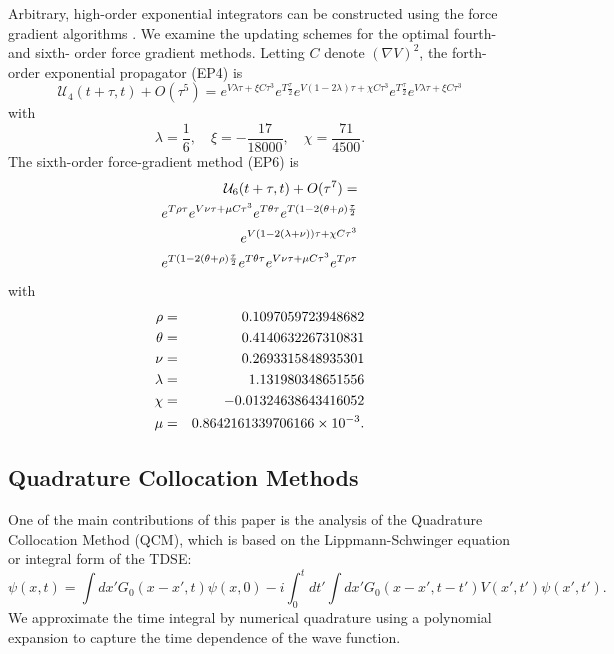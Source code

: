 \documentclass[review,letterpaper]{elsarticle}
\begin{document}
Arbitrary, high-order exponential integrators can be constructed using the
force gradient algorithms \cite{force-gradient}. We examine the updating schemes for the optimal fourth- and sixth- order force gradient methods.
\newcommand{\VTV}{C}
Letting $C$ denote $(\nabla V)^2$, the forth-order exponential propagator (EP4) is
\begin{equation}
\mathcal{U}_{4}(t+\tau,t) +O(\tau^5)=
e^{V \lambda \tau+\xi \VTV \tau^3}
e^{T \frac\tau 2}
e^{V(1-2\lambda)\tau+\chi \VTV \tau^3}
e^{T \frac\tau 2}
e^{V \lambda \tau+\xi \VTV \tau^3}
\end{equation}
with
\begin{equation}
\lambda=\frac16, \quad \xi=-\frac{17}{18000}, \quad \chi=\frac{71}{4500} .
\end{equation}
The sixth-order force-gradient method (EP6) is
\begin{eqnarray}
\mathcal{U}_{6}(t+\tau,t) +O(\tau^7)= \notag\\
e^{T \rho \tau} e^{V \nu \tau +\mu\VTV\tau^3} e^{T \theta \tau} e^{T (1-2(\theta+\rho)\frac \tau 2}\notag\\
e^{V(1-2(\lambda+\nu))\tau +\chi \VTV \tau^3}\notag\\
e^{T (1-2(\theta+\rho)\frac \tau 2} e^{T \theta \tau}e^{V \nu \tau +\mu\VTV\tau^3}e^{T \rho \tau}
\end{eqnarray}
with
\begin{eqnarray}
    \rho &=& 0.1097059723948682\notag\\
    \theta &=& 0.4140632267310831\notag\\
    \nu &=& 0.2693315848935301\notag\\
    \lambda &=& 1.131980348651556\notag\\
    \chi &=& -0.01324638643416052\notag\\
    \mu &=&  0.8642161339706166 \times {10}^{-3} .
\end{eqnarray}


\subsection{Quadrature Collocation Methods}
\label{S:QCM}
One of the main contributions of this paper is the analysis of the Quadrature Collocation Method
(QCM), which is based on the Lippmann-Schwinger equation or integral form of the TDSE:
\begin{equation}
\label{seq:refText13}
\psi (x,t)=\int dx'G_{0}(x-x',t)\psi (x,0)-i\int _{0}^{t}dt'\int dx'G_{0}(x-x',t-t')V(x',t')\psi (x',t').
\end{equation}
We approximate the time integral by
numerical quadrature using a polynomial expansion to capture the time dependence of the wave function.
\end{document}
